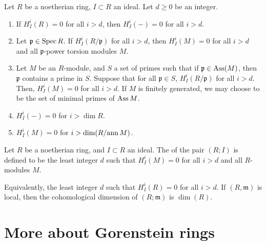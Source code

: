 \documentclass[12pt]{article}
\begin{document}
\begin{prop}
	Let $R$ be a noetherian ring, $I \subset R$ an ideal. Let $d \ge 0$ be an integer.
	\begin{enumerate}[label=(\alph*)]
		\item If $H_{I}^{i}(R) = 0$ for all $i > d$, then $H_{I}^{i}(-) = 0$ for all $i > d$.
		\item Let $\mathfrak{p} \in \operatorname{Spec} R$. If $H_{I}^{i}(R/\mathfrak{p})$ for all $i > d$, then $H_{I}^{i}(M) = 0$ for all $i > d$ and all $\mathfrak{p}$-power torsion modules $M$.
		\item Let $M$ be an $R$-module, and $S$ a set of primes such that if $\mathfrak{p} \in \operatorname{Ass}(M)$, then $\mathfrak{p}$ contains a prime in $S$. Suppose that for all $\mathfrak{p} \in S$, $H_{I}^{i}(R/\mathfrak{p})$ for all $i > d$. Then, $H_{I}^{i}(M) = 0$ for all $i > d$. \newline
		If $M$ is finitely generated, we may choose to be the set of minimal primes of $\operatorname{Ass} M$.
		\item $H_{I}^{i}(-) = 0$ for $i > \dim R$.
		\item $H_{I}^{i}(M) = 0$ for $i > \dim(R/{\operatorname{ann} M})$.
	\end{enumerate}
\end{prop}

\begin{defn}
	Let $R$ be a noetherian ring, and $I \subset R$ an ideal. The  of the pair $(R; I)$ is defined to be the least integer $d$ such that $H_{I}^{i}(M) = 0$ for all $i > d$ and all $R$-modules $M$.
\end{defn}
Equivalently, the least integer $d$ such that $H_{I}^{i}(R) = 0$ for all $i > d$. \newline
If $(R, \mathfrak{m})$ is local, then the cohomological dimension of $(R; \mathfrak{m})$ is $\dim(R)$.

\section{More about Gorenstein rings}
\end{document}
